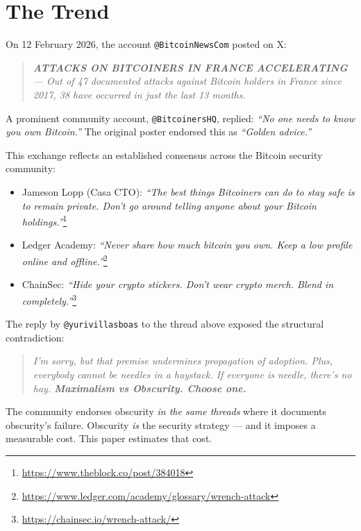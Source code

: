 \documentclass[a4paper,11pt]{article}
\begin{document}
\section{The Trend}

On 12 February 2026, the account \texttt{@BitcoinNewsCom} posted on X:

\begin{quote}\itshape
\textbf{ATTACKS ON BITCOINERS IN FRANCE ACCELERATING} --- Out of 47 documented attacks against Bitcoin holders in France since 2017, 38 have occurred in just the last 13 months.
\end{quote}

\noindent A prominent community account, \texttt{@BitcoinersHQ}, replied: \textit{``No one needs to know you own Bitcoin.''} The original poster endorsed this as \textit{``Golden advice.''}

This exchange reflects an established consensus across the Bitcoin security community:

\begin{itemize}[nosep,leftmargin=1.5em]
  \item Jameson Lopp (Casa CTO): \textit{``The best things Bitcoiners can do to stay safe is to remain private. Don't go around telling anyone about your Bitcoin holdings.''}\footnote{\url{https://www.theblock.co/post/384018}}
  \item Ledger Academy: \textit{``Never share how much bitcoin you own. Keep a low profile online and offline.''}\footnote{\url{https://www.ledger.com/academy/glossary/wrench-attack}}
  \item ChainSec: \textit{``Hide your crypto stickers. Don't wear crypto merch. Blend in completely.''}\footnote{\url{https://chainsec.io/wrench-attack/}}
\end{itemize}

\noindent The reply by \texttt{@yurivillasboas} to the thread above exposed the structural contradiction:

\begin{quote}\itshape
I'm sorry, but that premise undermines propagation of adoption. Plus, everybody cannot be needles in a haystack. If everyone is needle, there's no hay. \textbf{Maximalism vs Obscurity. Choose one.}
\end{quote}

\noindent The community endorses obscurity \textit{in the same threads} where it documents obscurity's failure. Obscurity \textit{is} the security strategy --- and it imposes a measurable cost. This paper estimates that cost.
\end{document}
